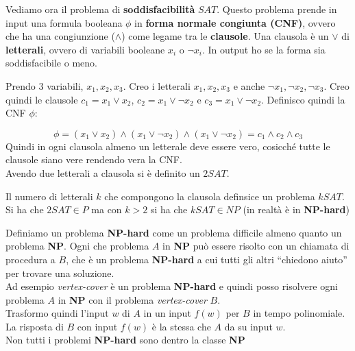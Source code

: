 			\begin{definizione}
				Vediamo ora il problema di \textbf{soddisfacibilità} $SAT$. Questo problema
				prende in input una formula booleana $\phi$ in \textbf{forma normale congiunta
					(CNF)}, ovvero che ha una congiunzione ($\land$) come legame tra le
				\textbf{clausole}. Una clausola è un $\lor$ di \textbf{letterali}, ovvero di
				variabili booleane $x_i$ o $\neg x_i$. In output ho se la forma sia
				soddisfacibile o meno. 
				\begin{esempio}
					Prendo 3 variabili, $x_1,x_2,x_3$. Creo i letterali  $x_1,x_2,x_3$ e anche
					$\neg x_1,\neg x_2,\neg x_3$. Creo quindi le clausole $c_1=x_1\lor x_2$,
					$c_2=x_1\lor \neg x_2$ e $c_3=x_1\lor \neg x_2$. Definisco quindi la CNF
					$\phi$:
										    
					\[\phi=(x_1\lor x_2)\land (x_1\lor \neg x_2)\land
						(x_1\lor \neg x_2)=c_1\land c_2\land c_3\]
						Quindi in ogni clausola almeno un letterale deve essere vero, cosicché tutte
						le clausole siano vere rendendo vera la CNF.\\
						Avendo due letterali a clausola si è definito un $2SAT$.
						\end{esempio}
						Il numero di letterali $k$ che compongono la clausola definsice un problema
						$kSAT$. Si ha che $2SAT\in P$ ma con $k>2$ si ha che $kSAT\in NP$ (in
						realtà è in \textbf{NP-hard})
						\end{definizione}
						\begin{definizione}
							Definiamo un problema \textbf{NP-hard} come un problema difficile almeno
							quanto un problema \textbf{NP}. Ogni che problema $A$ in \textbf{NP} può
							essere risolto con un chiamata di procedura a $B$, che è un problema
							\textbf{NP-hard} a cui tutti gli altri ``chiedono aiuto'' per trovare una
							soluzione. \\
							Ad esempio \textit{vertex-cover} è un problema \textbf{NP-hard} e quindi posso
							risolvere ogni problema $A$ in \textbf{NP} con il problema
							\textit{vertex-cover} $B$.\\
							Trasformo quindi l'input $w$ di $A$ in un input
							$f(w)$ per $B$ in tempo polinomiale. La risposta di $B$ con input $f(w)$ è la
							stessa che $A$ da su input $w$.\\
							Non tutti i problemi \textbf{NP-hard} sono dentro la classe \textbf{NP}
						\end{definizione}
